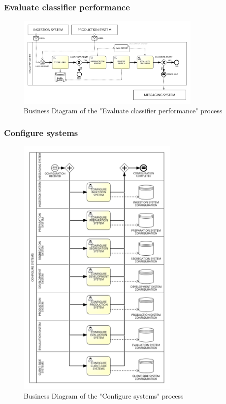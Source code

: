 \subsubsection{Evaluate classifier performance}
\label{sec:bpmn_evaluate_classifier_performance}

\begin{figure}[H]
\centering
\includegraphics[width=0.8\textwidth]{figures/Business Diagram - Evaluate Classifier Performance.png}
\caption{Business Diagram of the "Evaluate classifier performance" process}
\label{fig:bpmn_evaluate_classifier_performance}
\end{figure}

\subsubsection{Configure systems}
\label{sec:bpmn_configure_systems}

\begin{figure}[H]
\centering
\includegraphics[width=0.7\textwidth]{figures/Business Diagram - Configure Systems.png}
\caption{Business Diagram of the "Configure systems" process}
\label{fig:bpmn_configure_systems}
\end{figure}